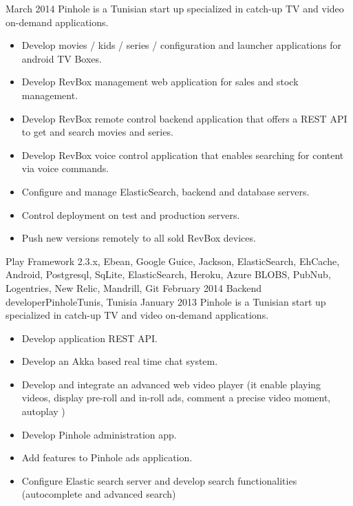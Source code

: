 \begin{experiences}
    {March 2014} {Pinhole is a Tunisian start up specialized in catch-up TV and video on-demand applications.}
                    {
                      \begin{itemize}
                        \item Develop movies / kids / series / configuration and launcher applications for android TV Boxes.
                        \item Develop RevBox management web application for sales and stock management.
                        \item Develop RevBox remote control backend application that offers a REST API to get and search movies and series.
                        \item Develop RevBox voice control application that enables searching for content via voice commands.
                        \item Configure and manage ElasticSearch, backend and database servers.
                        \item Control deployment on test and production servers.
                        \item Push new versions remotely to all sold RevBox devices.
                      \end{itemize}
                    }
                    { Play Framework 2.3.x, Ebean, Google Guice, Jackson, ElasticSearch, EhCache, Android, Postgresql, SqLite, ElasticSearch, Heroku, Azure BLOBS, PubNub, Logentries, New Relic, Mandrill, Git}
  \emptySeparator
  \experience
    {February 2014}   {Backend developer}{Pinhole}{Tunis, Tunisia}
    {January 2013} {Pinhole is a Tunisian start up specialized in catch-up TV and video on-demand applications.}
                    {
                      \begin{itemize}
                        \item Develop application REST API.
                        \item Develop an Akka based real time chat system.
                        \item Develop and integrate an advanced web video player (it enable playing videos, display pre-roll and in-roll ads, comment a precise video moment, autoplay )
                        \item Develop Pinhole administration app.
                        \item Add features to Pinhole ads application.
                        \item Configure Elastic search server and develop search functionalities (autocomplete and advanced search)

\end{itemize}}
\end{experiences}
